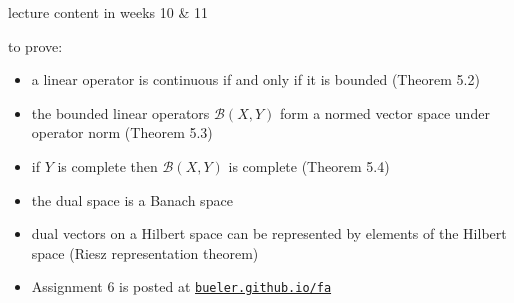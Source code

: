 \documentclass[10pt,
               svgnames,
               hyperref={colorlinks,
                         citecolor=DeepPink4,
                         linkcolor=FireBrick,
                         urlcolor=blue},
               usepdftitle=false]{beamer}
\newcommand{\cB}{\mathcal{B}}
\begin{document}
\begin{frame}{lecture content in weeks 10 \& 11}

\begin{block}{to prove:}
\begin{itemize}
\item a linear operator is continuous if and only if it is bounded (Theorem 5.2)
\item the bounded linear operators $\cB(X,Y)$ form a normed vector space under operator norm (Theorem 5.3)
\item if $Y$ is complete then $\cB(X,Y)$ is complete (Theorem 5.4)
\item the dual space is a Banach space
\item dual vectors on a Hilbert space can be represented by elements of the Hilbert space (Riesz representation theorem)
\end{itemize}
\end{block}

\begin{itemize}
\item Assignment 6 is posted at \quad  \href{https://bueler.github.io/fa/index.html}{\texttt{bueler.github.io/fa}}
\end{itemize}
\end{frame}
\end{document}
